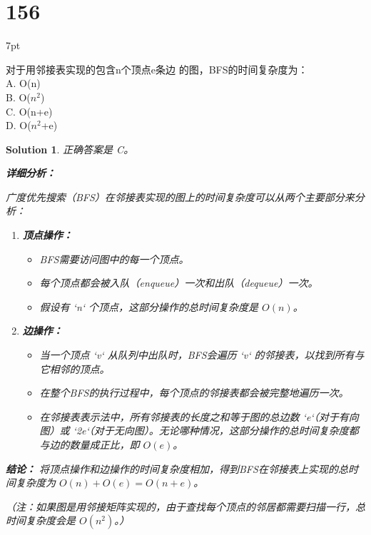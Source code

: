 \documentclass[UTF8]{report}
\newtheorem{solution}{Solution}
\theoremstyle{MyLineTheoremStyle} %
\theoremstyle{MyBlockTheoremStyle} %
\theoremstyle{MySubsubsectionStyle} %
\newenvironment{graybox}{%
        \def\FrameCommand{%
        \hspace{1pt}%
        {\color{gray}\small \vrule width 2pt}%
        {\color{graybox_color}\vrule width 4pt}%
        \colorbox{graybox_color}%
        }%
        \MakeFramed{\advance\hsize-\width\FrameRestore}%
        \noindent\hspace{-4.55pt}%
        \begin{adjustwidth}{}{7pt}%
        \vspace{2pt}\vspace{2pt}%
        }
        {%
        \vspace{2pt}\end{adjustwidth}\endMakeFramed%
        }
\begin{document}
\section*{156}
\begin{graybox}
对于用邻接表实现的包含n个顶点e条边
的图，BFS的时间复杂度为：\\
A. O(n)\\
B. O($n^2$)\\
C. O(n+e)\\
D. O($n^2$+e)\\
\end{graybox}

\begin{solution}
正确答案是 C。

\textbf{详细分析：}

广度优先搜索（BFS）在邻接表实现的图上的时间复杂度可以从两个主要部分来分析：

\begin{enumerate}
    \item \textbf{顶点操作：}
    \begin{itemize}
        \item BFS需要访问图中的每一个顶点。
        \item 每个顶点都会被入队（enqueue）一次和出队（dequeue）一次。
        \item 假设有 `n` 个顶点，这部分操作的总时间复杂度是 $O(n)$。
    \end{itemize}

    \item \textbf{边操作：}
    \begin{itemize}
        \item 当一个顶点 `v` 从队列中出队时，BFS会遍历 `v` 的邻接表，以找到所有与它相邻的顶点。
        \item 在整个BFS的执行过程中，每个顶点的邻接表都会被完整地遍历一次。
        \item 在邻接表表示法中，所有邻接表的长度之和等于图的总边数 `e`（对于有向图）或 `2e`（对于无向图）。无论哪种情况，这部分操作的总时间复杂度都与边的数量成正比，即 $O(e)$。
    \end{itemize}
\end{enumerate}

\textbf{结论：}
将顶点操作和边操作的时间复杂度相加，得到BFS在邻接表上实现的总时间复杂度为 $O(n) + O(e) = O(n+e)$。

（注：如果图是用邻接矩阵实现的，由于查找每个顶点的邻居都需要扫描一行，总时间复杂度会是 $O(n^2)$。）
\end{solution}
\end{document}
